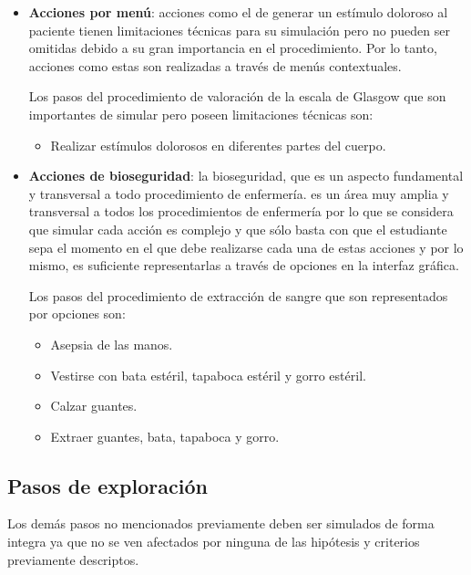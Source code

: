 \begin{itemize}
\item 
    \textbf{Acciones por menú}: acciones como el de generar un estímulo doloroso
    al paciente tienen limitaciones técnicas para su simulación pero no pueden
    ser omitidas debido a su gran importancia en el procedimiento. Por lo tanto,
    acciones como estas son realizadas a través de menús contextuales.
    
    Los pasos del procedimiento de valoración de la escala de Glasgow que son
    importantes de simular pero poseen limitaciones técnicas son:
    \begin{itemize} 
    \item Realizar estímulos dolorosos en diferentes partes del cuerpo. 
    \end{itemize}
    
    

\item 
    \textbf{Acciones de bioseguridad}: la bioseguridad, que es un aspecto
    fundamental y transversal a todo procedimiento de enfermería. es un área muy amplia y 
    transversal a todos los procedimientos de enfermería por lo que se considera 
    que simular cada acción es complejo y que sólo basta con que el estudiante sepa 
    el momento en el que debe realizarse cada una de estas acciones y por lo mismo,
    es suficiente representarlas a través de opciones en la interfaz gráfica.
    
    Los pasos del procedimiento de extracción de sangre que son representados por 
    opciones son:
    \begin{itemize}
        \item Asepsia de las manos.
        \item Vestirse con bata estéril, tapaboca estéril y gorro estéril.
        \item Calzar guantes.
        \item Extraer guantes, bata, tapaboca y gorro.
    \end{itemize}
    

\end{itemize}

\subsection{Pasos de exploración}

Los demás pasos no mencionados previamente deben ser simulados de forma 
integra ya que no se ven afectados por ninguna de las hipótesis y criterios previamente
descriptos.


